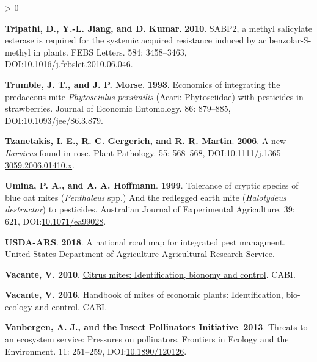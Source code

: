 \documentclass{ufdissertation}[overrideChapters] %
\newlength{\cslhangindent}
\newenvironment{CSLReferences}[2] %
 {%
  \setlength{\parindent}{0pt}
  \ifodd #1 \everypar{\setlength{\hangindent}{\cslhangindent}}\ignorespaces\fi
  \ifnum #2 > 0
  \setlength{\parskip}{#2\baselineskip}
  \fi
 }%
 {}
\begin{document}
{\begin{CSLReferences}{1}{1}
\leavevmode{}%
\textbf{Tripathi, D., Y.-L. Jiang, and D. Kumar}. \textbf{2010}. {SABP}2, a methyl salicylate esterase is required for the systemic acquired resistance induced by acibenzolar-{S}-methyl in plants. {FEBS} Letters. 584: 3458--3463, DOI:\href{https://doi.org/10.1016/j.febslet.2010.06.046}{10.1016/j.febslet.2010.06.046}.

\leavevmode{}%
\textbf{Trumble, J. T., and J. P. Morse}. \textbf{1993}. Economics of integrating the predaceous mite {\emph{Phytoseiulus persimilis}} ({{Acari}: {Phytoseiidae}}) with pesticides in strawberries. Journal of Economic Entomology. 86: 879--885, DOI:\href{https://doi.org/10.1093/jee/86.3.879}{10.1093/jee/86.3.879}.

\leavevmode{}%
\textbf{Tzanetakis, I. E., R. C. Gergerich, and R. R. Martin}. \textbf{2006}. A new {\emph{Ilarvirus}} found in rose. Plant Pathology. 55: 568--568, DOI:\href{https://doi.org/10.1111/j.1365-3059.2006.01410.x}{10.1111/j.1365-3059.2006.01410.x}.

\leavevmode{}%
\textbf{Umina, P. A., and A. A. Hoffmann}. \textbf{1999}. Tolerance of cryptic species of blue oat mites ({\emph{Penthaleus}} spp.) And the redlegged earth mite ({\emph{Halotydeus destructor}}) to pesticides. Australian Journal of Experimental Agriculture. 39: 621, DOI:\href{https://doi.org/10.1071/ea99028}{10.1071/ea99028}.

\leavevmode{}%
\textbf{USDA-ARS}. \textbf{2018}. A national road map for integrated pest managment. {United States} Department of Agriculture-Agricultural Research Service.

\leavevmode{}%
\textbf{Vacante, V.} \textbf{2010}. \href{https://www.ebook.de/de/product/8907013/vincenzo_vacante_citrus_mites_identification_bionomy_and_control.html}{Citrus mites: Identification, bionomy and control}. CABI.

\leavevmode{}%
\textbf{Vacante, V.} \textbf{2016}. \href{https://www.ebook.de/de/product/24216869/vincenzo_vacante_handbook_of_mites_of_economic_plants_identification_bio_ecology_and_control.html}{Handbook of mites of economic plants: Identification, bio-ecology and control}. CABI.

\leavevmode{}%
\textbf{Vanbergen, A. J., and the Insect Pollinators Initiative}. \textbf{2013}. Threats to an ecosystem service: Pressures on pollinators. Frontiers in Ecology and the Environment. 11: 251--259, DOI:\href{https://doi.org/10.1890/120126}{10.1890/120126}.


\end{CSLReferences}}
\end{document}
